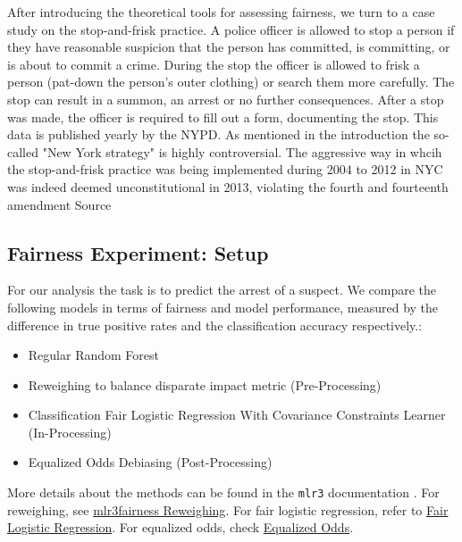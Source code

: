 After introducing the theoretical tools for assessing fairness, we turn to a case study on the stop-and-frisk practice. A police officer is allowed to stop a person if they have reasonable suspicion that the person has committed, is committing, or is about to commit a crime.
During the stop the officer is allowed to frisk a person (pat-down the person's outer clothing) or search them more carefully.
The stop can result in a summon, an arrest or no further consequences. After a stop was made, the officer is required to fill out a form, documenting the stop. This data is published yearly by the NYPD.
As mentioned in the introduction the so-called "New York strategy" \cite{gelman2007} is highly controversial. The aggressive way in whcih the stop-and-frisk practice was being implemented during 2004 to 2012 in NYC was indeed deemed unconstitutional in 2013, violating the fourth and fourteenth amendment {\color{red} Source}


\subsection{Fairness Experiment: Setup}
For our analysis the task is to predict the arrest of a suspect. We compare the following models in terms of fairness and model performance, measured by the difference in true positive rates and the classification accuracy respectively.:
\begin{itemize}
    \item Regular Random Forest
    \item Reweighing to balance disparate impact metric (Pre-Processing)
    \item Classification Fair Logistic Regression With Covariance Constraints Learner (In-Processing)
    \item Equalized Odds Debiasing (Post-Processing)
\end{itemize}
More details about the methods can be found in the \texttt{mlr3} documentation \cite{mlr3_book}.  
For reweighing, see \href{https://mlr3fairness.mlr-org.com/reference/mlr_pipeops_reweighing.html}{mlr3fairness Reweighing}.  
For fair logistic regression, refer to \href{https://rdrr.io/cran/mlr3fairness/man/mlr_learners_classif.fairzlrm.html}{Fair Logistic Regression}.  
For equalized odds, check \href{https://mlr3fairness.mlr-org.com/reference/mlr_pipeops_equalized_odds.html}{Equalized Odds}.  


